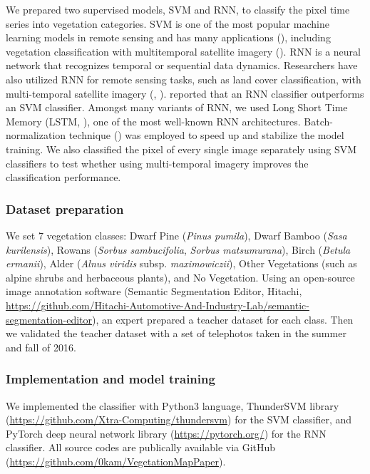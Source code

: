 \documentclass{article}
\begin{document}
We prepared two supervised models, SVM and RNN, to classify the pixel time series into vegetation categories. SVM is one of the most popular machine learning models in remote sensing and has many applications (\cite{Mountrakis2011SVMReview}), including vegetation classification with multitemporal satellite imagery (\cite{Tigges2013RemSenEnv}). RNN is a neural network that recognizes temporal or sequential data dynamics. Researchers have also utilized RNN for remote sensing tasks, such as land cover classification, with multi-temporal satellite imagery (\cite{Ienco2017RemSenLSTM}, \cite{Sharma2018NN}). \cite{Ienco2017RemSenLSTM} reported that an RNN classifier outperforms an SVM classifier. Amongst many variants of RNN, we used Long Short Time Memory (LSTM, \cite{Hochreiter1997LSTM}), one of the most well-known RNN architectures. Batch-normalization technique (\cite{IoffeSzegedy2015BatchNorm}) was employed to speed up and stabilize the model training. We also classified the pixel of every single image separately using SVM classifiers to test whether using multi-temporal imagery improves the classification performance.

\hypertarget{dataset-preparation}{%
\subsubsection{Dataset preparation}\label{dataset-preparation}}

We set 7 vegetation classes: Dwarf Pine (\emph{Pinus pumila}), Dwarf Bamboo (\emph{Sasa kurilensis}), Rowans (\emph{Sorbus sambucifolia}, \emph{Sorbus matsumurana}), Birch (\emph{Betula ermanii}), Alder (\emph{Alnus viridis} subsp. \emph{maximowiczii}), Other Vegetations (such as alpine shrubs and herbaceous plants), and No Vegetation. Using an open-source image annotation software (Semantic Segmentation Editor, Hitachi, \url{https://github.com/Hitachi-Automotive-And-Industry-Lab/semantic-segmentation-editor}), an expert prepared a teacher dataset for each class. Then we validated the teacher dataset with a set of telephotos taken in the summer and fall of 2016.

\hypertarget{implementation-and-model-training}{%
\subsubsection{Implementation and model training}\label{implementation-and-model-training}}

We implemented the classifier with Python3 language, ThunderSVM library (\url{https://github.com/Xtra-Computing/thundersvm}) for the SVM classifier, and PyTorch deep neural network library (\url{https://pytorch.org/}) for the RNN classifier. All source codes are publically available via GitHub (\url{https://github.com/0kam/VegetationMapPaper}).
\end{document}
